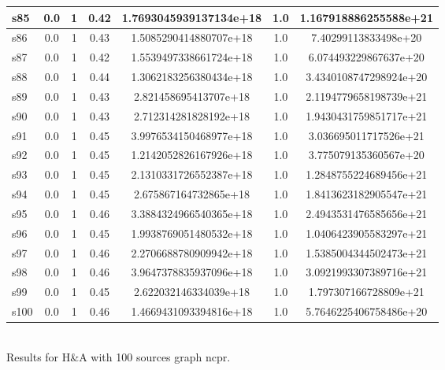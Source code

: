 \documentclass{article}
\begin{document}
\begin{tabular}{|l|c|c|c|c|c|c|}
\hline
s85 &0.0 & 1 & 0.42 & 1.7693045939137134e+18 & 1.0 & 1.167918886255588e+21\\
\hline
s86 &0.0 & 1 & 0.43 & 1.5085290414880707e+18 & 1.0 & 7.40299113833498e+20\\
\hline
s87 &0.0 & 1 & 0.42 & 1.5539497338661724e+18 & 1.0 & 6.074493229867637e+20\\
\hline
s88 &0.0 & 1 & 0.44 & 1.3062183256380434e+18 & 1.0 & 3.4340108747298924e+20\\
\hline
s89 &0.0 & 1 & 0.43 & 2.821458695413707e+18 & 1.0 & 2.1194779658198739e+21\\
\hline
s90 &0.0 & 1 & 0.43 & 2.712314281828192e+18 & 1.0 & 1.9430431759851717e+21\\
\hline
s91 &0.0 & 1 & 0.45 & 3.9976534150468977e+18 & 1.0 & 3.036695011717526e+21\\
\hline
s92 &0.0 & 1 & 0.45 & 1.2142052826167926e+18 & 1.0 & 3.775079135360567e+20\\
\hline
s93 &0.0 & 1 & 0.45 & 2.1310331726552387e+18 & 1.0 & 1.2848755224689456e+21\\
\hline
s94 &0.0 & 1 & 0.45 & 2.675867164732865e+18 & 1.0 & 1.8413623182905547e+21\\
\hline
s95 &0.0 & 1 & 0.46 & 3.3884324966540365e+18 & 1.0 & 2.4943531476585656e+21\\
\hline
s96 &0.0 & 1 & 0.45 & 1.9938769051480532e+18 & 1.0 & 1.0406423905583297e+21\\
\hline
s97 &0.0 & 1 & 0.46 & 2.2706688780909942e+18 & 1.0 & 1.5385004344502473e+21\\
\hline
s98 &0.0 & 1 & 0.46 & 3.9647378835937096e+18 & 1.0 & 3.0921993307389716e+21\\
\hline
s99 &0.0 & 1 & 0.45 & 2.622032146334039e+18 & 1.0 & 1.797307166728809e+21\\
\hline
s100 &0.0 & 1 & 0.46 & 1.4669431093394816e+18 & 1.0 & 5.7646225406758486e+20\\
\hline
\end{tabular}\\

\noindent Results for H\&A with 100 sources graph ncpr.
\end{document}
